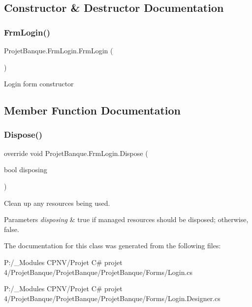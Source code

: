 \subsection{Constructor \& Destructor Documentation}
\mbox{\label{class_projet_banque_1_1_frm_login_a7b5b2a53d0d6a32dbf81520c356645b4}} 
\subsubsection{\texorpdfstring{FrmLogin()}{FrmLogin()}}
{\footnotesize\ttfamily Projet\+Banque.\+Frm\+Login.\+Frm\+Login (\begin{DoxyParamCaption}{ }\end{DoxyParamCaption})}



Login form constructor 



\subsection{Member Function Documentation}
\mbox{\label{class_projet_banque_1_1_frm_login_a95d917ac105856fc6a14e061f25711df}} 
\subsubsection{\texorpdfstring{Dispose()}{Dispose()}}
{\footnotesize\ttfamily override void Projet\+Banque.\+Frm\+Login.\+Dispose (\begin{DoxyParamCaption}\item[{bool}]{disposing }\end{DoxyParamCaption})\hspace{0.3cm}{\ttfamily [protected]}}



Clean up any resources being used. 


\begin{DoxyParams}{Parameters}
{\em disposing} & true if managed resources should be disposed; otherwise, false.\\
\hline
\end{DoxyParams}


The documentation for this class was generated from the following files\+:\begin{DoxyCompactItemize}
\item 
P\+:/\+\_\+\+Modules C\+P\+N\+V/\+Projet C\# projet 4/\+Projet\+Banque/\+Projet\+Banque/\+Projet\+Banque/\+Forms/Login.\+cs\item 
P\+:/\+\_\+\+Modules C\+P\+N\+V/\+Projet C\# projet 4/\+Projet\+Banque/\+Projet\+Banque/\+Projet\+Banque/\+Forms/Login.\+Designer.\+cs\end{DoxyCompactItemize}

